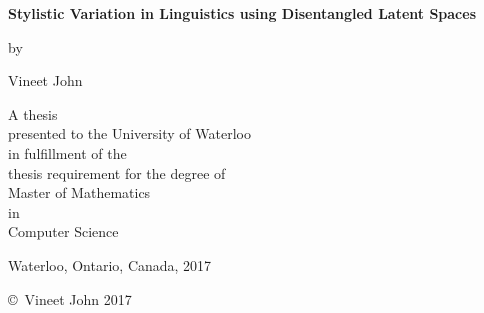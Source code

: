 \pagestyle{empty}

\begin{titlepage}
	\begin{center}
		\vspace*{1.0cm}

		\Huge
		{\bf Stylistic Variation in Linguistics using Disentangled Latent Spaces}

		\vspace*{1.0cm}

		\normalsize
		by \\

		\vspace*{1.0cm}

		\Large
		Vineet John \\

		\vspace*{3.0cm}

		\normalsize
		A thesis \\
		presented to the University of Waterloo \\
		in fulfillment of the \\
		thesis requirement for the degree of \\
		Master of Mathematics \\
		in \\
		Computer Science \\

		\vspace*{2.0cm}

		Waterloo, Ontario, Canada, 2017 \\

		\vspace*{1.0cm}

		\copyright\ Vineet John 2017 \\
	\end{center}
\end{titlepage}

\pagestyle{plain}
\setcounter{page}{2}

\cleardoublepage %

